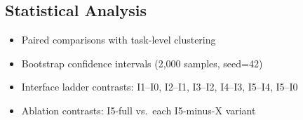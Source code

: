 \subsection{Statistical Analysis}
\begin{itemize}
    \item Paired comparisons with task-level clustering
    \item Bootstrap confidence intervals (2,000 samples, seed=42)
    \item Interface ladder contrasts: I1--I0, I2--I1, I3--I2, I4--I3, I5--I4, I5--I0
    \item Ablation contrasts: I5-full vs.\ each I5-minus-X variant
\end{itemize}

